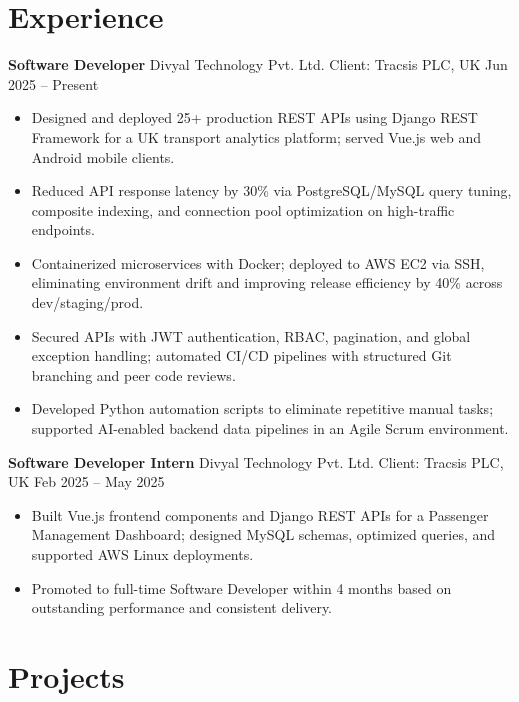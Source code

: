 \documentclass[10pt,a4paper]{article}
\begin{document}
\section{Experience}

{\small\textbf{Software Developer} \textbar{} Divyal Technology Pvt. Ltd. \textbar{} Client: Tracsis PLC, UK \hfill Jun 2025 -- Present}
\begin{itemize}
  \item Designed and deployed 25+ production REST APIs using Django REST Framework for a UK transport analytics platform; served Vue.js web and Android mobile clients.
  \item Reduced API response latency by 30\% via PostgreSQL/MySQL query tuning, composite indexing, and connection pool optimization on high-traffic endpoints.
  \item Containerized microservices with Docker; deployed to AWS EC2 via SSH, eliminating environment drift and improving release efficiency by 40\% across dev/staging/prod.
  \item Secured APIs with JWT authentication, RBAC, pagination, and global exception handling; automated CI/CD pipelines with structured Git branching and peer code reviews.
  \item Developed Python automation scripts to eliminate repetitive manual tasks; supported AI-enabled backend data pipelines in an Agile Scrum environment.
\end{itemize}

\vspace{3pt}
{\small\textbf{Software Developer Intern} \textbar{} Divyal Technology Pvt. Ltd. \textbar{} Client: Tracsis PLC, UK \hfill Feb 2025 -- May 2025}
\begin{itemize}
  \item Built Vue.js frontend components and Django REST APIs for a Passenger Management Dashboard; designed MySQL schemas, optimized queries, and supported AWS Linux deployments.
  \item Promoted to full-time Software Developer within 4 months based on outstanding performance and consistent delivery.
\end{itemize}

\section{Projects}
\end{document}
